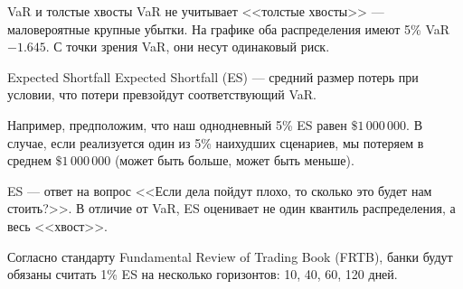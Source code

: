 \documentclass{beamer}
\begin{document}
\begin{frame}{VaR и толстые хвосты}
\justify
VaR не учитывает <<толстые хвосты>> --- маловероятные крупные убытки. На графике оба распределения имеют 5\% VaR $-1.645$. С точки зрения VaR, они несут одинаковый риск.

\justify
\centering
{}
\end{frame}



\begin{frame}{Expected Shortfall}
\justify
\alert{Expected Shortfall (ES)} --- средний размер потерь при условии, что потери превзойдут соответствующий VaR.

\justify
Например, предположим, что наш однодневный 5\% ES равен $\$1\,000\,000$. В случае, если реализуется один из 5\% наихудших сценариев, мы потеряем в среднем $\$1\,000\,000$ (может быть больше, может быть меньше).

\justify
ES --- ответ на вопрос <<Если дела пойдут плохо, то сколько это будет нам стоить?>>. В отличие от VaR, ES оценивает не один квантиль распределения, а весь <<хвост>>.

\justify
Согласно стандарту Fundamental Review of Trading Book (FRTB), банки будут обязаны считать 1\% ES на несколько горизонтов: 10, 40, 60, 120 дней.
\end{frame}
\end{document}
